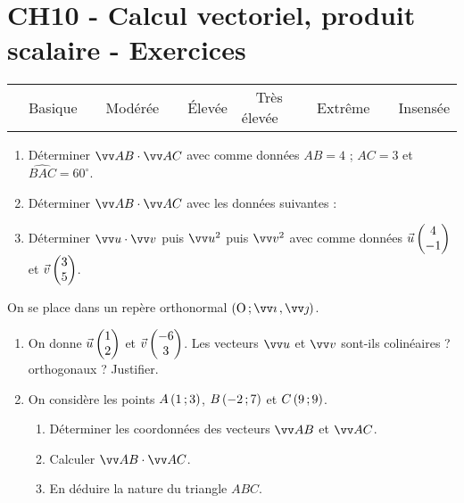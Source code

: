 \documentclass[a4paper,11pt]{article}
\author{Pierquet}
\title{\nomfichier}
\begin{document}
\pagestyle{fancy}

\part{CH10 - Calcul vectoriel, produit scalaire - Exercices}

\medskip

\begin{caide}
{\setlength\arrayrulewidth{1.5pt} 
\begin{tabularx}{\linewidth}{Y|Y|Y|Y|Y|Y}
	~~\textsf{Basique} & ~~\textsf{Modérée} & ~~\textsf{Élevée} & ~~\textsf{Très élevée} & ~~\textsf{Extrême} & ~~\textsf{Insensée} \\
\end{tabularx}}
\end{caide}


\begin{enumerate}
	\item Déterminer $\vect{AB}\cdot\vect{AC}$ avec comme données $AB=4$ ; $AC=3$ et $\widehat{BAC}=60^{\circ}$.
	\item Déterminer $\vect{AB}\cdot\vect{AC}$ avec les données suivantes :
	\begin{center}
	\end{center}
	\item Déterminer $\vect{u}\cdot\vect{v}$ puis $\vect{u}^2$ puis $\vect{v}^2$ avec comme données $\vec{u}\begin{pmatrix} 4 \\ -1 \end{pmatrix}$ et $\vec{v}\begin{pmatrix} 3 \\ 5 \end{pmatrix}$.
\end{enumerate}

\medskip


\medskip

On se place dans un repère orthonormal $\Rij$.

\begin{enumerate}
	\item On donne $\vec{u}\begin{pmatrix} 1 \\ 2 \end{pmatrix}$ et $\vec{v}\begin{pmatrix} -6 \\ 3 \end{pmatrix}$. Les vecteurs $\vect{u}$ et $\vect{v}$ sont-ils colinéaires ? orthogonaux ? Justifier.
	\item On considère les points $A\left(1\mathpunct{};3\right)$, $B\left(-2\mathpunct{};7\right)$ et $C\left(9\mathpunct{};9\right)$.
	\begin{enumerate}
		\item Déterminer les coordonnées des vecteurs $\vect{AB}$ et $\vect{AC}$.
		\item Calculer $\vect{AB}\cdot\vect{AC}$.
		\item En déduire la nature du triangle $ABC$.
	\end{enumerate}
\end{enumerate}
\end{document}
